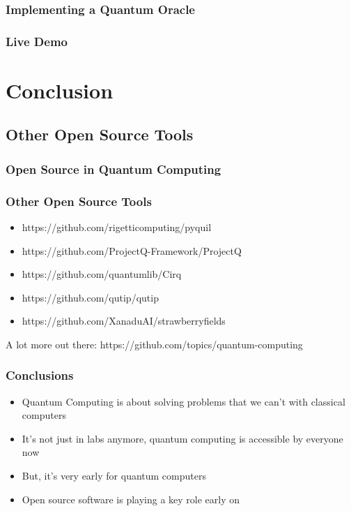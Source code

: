 \documentclass[aspectratio=169,11pt,hyperref={colorlinks=true}]{beamer}
\begin{document}
\begin{frame}
    \frametitle{Implementing a Quantum Oracle}

\end{frame}

\begin{frame}
    \frametitle{Live Demo}
\end{frame}


\section{Conclusion}
\subsection{Other Open Source Tools}
\begin{frame}
    \frametitle{Open Source in Quantum Computing}

\end{frame}

\begin{frame}
    \frametitle{Other Open Source Tools}
    \begin{itemize}
        \item https://github.com/rigetticomputing/pyquil
        \item https://github.com/ProjectQ-Framework/ProjectQ
        \item https://github.com/quantumlib/Cirq
        \item https://github.com/qutip/qutip
        \item https://github.com/XanaduAI/strawberryfields
    \end{itemize}
    A lot more out there:
    https://github.com/topics/quantum-computing
\end{frame}

\begin{frame}
    \frametitle{Conclusions}
    \begin{itemize}
        \item Quantum Computing is about solving problems that we can't with
            classical computers
        \item It's not just in labs anymore, quantum computing is accessible by
            everyone now
        \item But, it's very early for quantum computers
        \item Open source software is playing a key role early on
    \end{itemize}

\end{frame}
\end{document}
